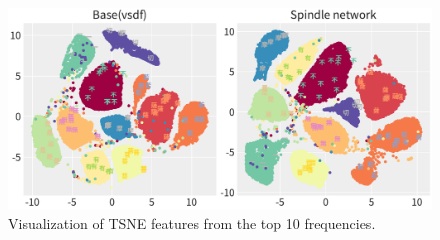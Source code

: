 
\begin{figure}[!t]
    \begin{center}
    \includegraphics[width=1.0\linewidth]{figures/tsne.pdf}
    \end{center}
    \caption{Visualization of TSNE features from the top 10 frequencies.}
    \label{fig:tsne}
\end{figure}

    